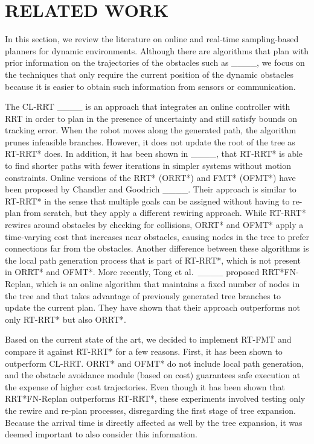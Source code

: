 \section{RELATED WORK}
\label{sec:related}
In this section, we review the literature on online and real-time sampling-based planners for dynamic environments. Although there are algorithms that plan with prior information on the trajectories of the obstacles such as ____, we focus on the techniques that only require the current position of the dynamic obstacles because it is easier to obtain such information from sensors or communication.

The CL-RRT ____ is an approach that integrates an online controller with RRT in order to plan in the presence of uncertainty and still satisfy bounds on tracking error. When the robot moves along the generated path, the algorithm prunes infeasible branches. However, it does not update the root of the tree as RT-RRT* does. In addition, it has been shown in ____, that RT-RRT* is able to find shorter paths with fewer iterations in simpler systems without motion constraints. Online versions of the RRT* (ORRT*) and FMT* (OFMT*) have been proposed by Chandler and Goodrich ____. Their approach is similar to RT-RRT* in the sense that multiple goals can be assigned without having to re-plan from scratch, but they apply a different rewiring approach. While RT-RRT* rewires around obstacles by checking for collisions, ORRT* and OFMT* apply a time-varying cost that increases near obstacles, causing nodes in the tree to prefer connections far from the obstacles. Another difference between these algorithms is the local path generation process that is part of RT-RRT*, which is not present in ORRT* and OFMT*. More recently, Tong et al.\ ____ proposed RRT*FN-Replan, which is an online algorithm that maintains a fixed number of nodes in the tree and that takes advantage of previously generated tree branches to update the current plan. They have shown that their approach outperforms not only RT-RRT* but also ORRT*. 

Based on the current state of the art, we decided to implement RT-FMT and compare it against RT-RRT* for a few reasons. First, it has been shown to outperform CL-RRT. ORRT* and OFMT* do not include local path generation, and the obstacle avoidance module (based on cost) guarantees safe execution at the expense of higher cost trajectories. Even though it has been shown that RRT*FN-Replan outperforms RT-RRT*, these experiments involved testing only the rewire and re-plan processes, disregarding the first stage of tree expansion. Because the arrival time is directly affected as well by the tree expansion, it was deemed important to also consider this information.